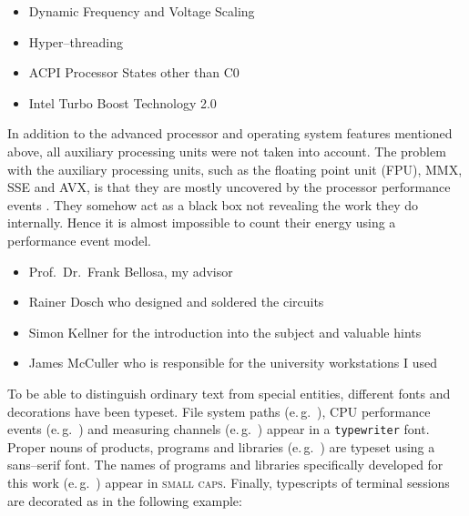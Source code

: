 \begin{itemize}

\item Dynamic Frequency and Voltage Scaling \cite{DVFS}

\item Hyper--threading \cite{HT}

\item ACPI Processor States other than C0 \cite{ACPI}

\item Intel\TReg{} Turbo Boost Technology 2.0 \cite{IntelTurboBoost}

\end{itemize}

In addition to the advanced processor and operating system features mentioned
above, all auxiliary processing units were not taken into account. The
problem with the auxiliary processing units, such as the floating point unit
(FPU), MMX\cite{wiki:MMX}, SSE\cite{wiki:SSE} and AVX\cite{AVX}, is that
they are mostly uncovered by the processor performance events
\cite{intel2011events}. They somehow act as a black box not revealing the
work they do internally. Hence it is almost impossible to count their energy
using a performance event model.


\begin{itemize}

\item Prof.\ Dr.\ Frank Bellosa, my advisor

\item Rainer Dosch who designed and soldered the circuits

\item Simon Kellner for the introduction into the subject and valuable hints

\item James McCuller who is responsible for the university workstations I used

\end{itemize}


\label{sec:preliminaries}

To be able to distinguish ordinary text from special entities, different fonts
and decorations have been typeset. File system paths (e.\,g.\ ),
CPU performance events (e.\,g.\ \JWctrCLK{}) and measuring channels (e.\,g.\ 
) appear in a \texttt{typewriter} font. Proper nouns of
products, programs and libraries (e.\,g.\ \JWTleaps{}) are typeset using a
\textsf{sans--serif} font. The names of programs and libraries specifically
developed for this work (e.\,g.\ \JWTdd{}) appear in \textsc{small caps}.
Finally, typescripts of terminal sessions are decorated as in the following
example:

